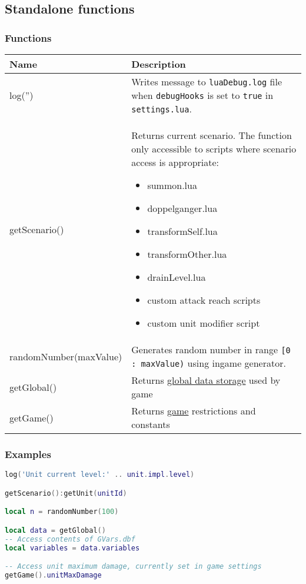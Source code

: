 \subsection{Standalone functions}
\subsubsection{Functions}
\begin{center}
\begin{tabularx}{\linewidth}{| l | X |}
\hline
\textbf{Name} & \textbf{Description} \\
\hline
log('') & Writes message to \texttt{luaDebug.log} file when \texttt{debugHooks} is set to \texttt{true} in \texttt{settings.lua}.\\
\hline
getScenario() & Returns current scenario. The function only accessible to scripts where scenario access is appropriate:
\begin{itemize}
\item summon.lua
\item doppelganger.lua
\item transformSelf.lua
\item transformOther.lua
\item drainLevel.lua
\item custom attack reach scripts
\item custom unit modifier script
\end{itemize}
\\
\hline
randomNumber(maxValue) & Generates random number in range \texttt{[0 : maxValue)} using ingame generator.\\
\hline
getGlobal() & Returns \hyperref[Global]{global data storage} used by game\\
\hline
getGame() & Returns \hyperref[Game]{game} restrictions and constants\\
\hline
\end{tabularx}
\end{center}
\subsubsection{Examples}
\begin{center}
\begin{lstlisting}[language=Lua]
log('Unit current level:' .. unit.impl.level)

getScenario():getUnit(unitId)

local n = randomNumber(100)

local data = getGlobal()
-- Access contents of GVars.dbf
local variables = data.variables

-- Access unit maximum damage, currently set in game settings
getGame().unitMaxDamage
\end{lstlisting}
\end{center}